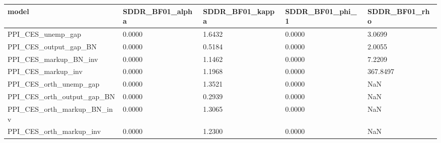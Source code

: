 \begin{tabular}{lllll}
\toprule
model & SDDR_BF01_alpha & SDDR_BF01_kappa & SDDR_BF01_phi_1 & SDDR_BF01_rho \\
\midrule
PPI_CES_unemp_gap & 0.0000 & 1.6432 & 0.0000 & 3.0699 \\
PPI_CES_output_gap_BN & 0.0000 & 0.5184 & 0.0000 & 2.0055 \\
PPI_CES_markup_BN_inv & 0.0000 & 1.1462 & 0.0000 & 7.2209 \\
PPI_CES_markup_inv & 0.0000 & 1.1968 & 0.0000 & 367.8497 \\
PPI_CES_orth_unemp_gap & 0.0000 & 1.3521 & 0.0000 & NaN \\
PPI_CES_orth_output_gap_BN & 0.0000 & 0.2939 & 0.0000 & NaN \\
PPI_CES_orth_markup_BN_inv & 0.0000 & 1.3065 & 0.0000 & NaN \\
PPI_CES_orth_markup_inv & 0.0000 & 1.2300 & 0.0000 & NaN \\
\bottomrule
\end{tabular}
